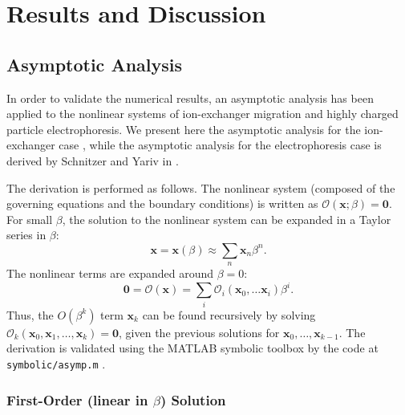 \documentclass[MSc,beforeExam]{iitcsthesis}
\newcommand\bx{\boldsymbol{x}}
\newcommand\bzero{\boldsymbol{0}}
\newcommand\cO{\mathcal{O}}
\begin{document}
\chapter{Results and Discussion} \label{ch:results}

\section{Asymptotic Analysis} \label{sec:asymp}
In order to validate the numerical results, an asymptotic analysis has been applied 
to the nonlinear systems of ion-exchanger migration 
and highly charged particle electrophoresis.
We present here the asymptotic analysis for the ion-exchanger case \cite{yariv2010migration},
while the asymptotic analysis for the electrophoresis case \cite{schnitzer2012surface}
is derived by Schnitzer and Yariv in \cite{schnitzer2012cubic}.

The derivation is performed as follows.
The nonlinear system (composed of the governing equations and the boundary conditions) 
is written as $\cO(\bx;\beta) = \bzero$.
For small $\beta$, the solution to the nonlinear system can be expanded in a Taylor series in $\beta$:
\begin{equation}
\bx = \bx(\beta) \approx \sum_n \bx_n \beta^n.
\end{equation}
The nonlinear terms
are expanded around $\beta = 0$:
\begin{equation}
\bzero = \cO(\bx) = \sum_i \cO_i(\bx_0, \ldots \bx_i) \beta^i.
\end{equation}
Thus, the $O(\beta^k)$ term $\bx_k$ can be found recursively by solving 
$\cO_k(\bx_0, \bx_1, \ldots, \bx_k) = \bzero$,
given the previous solutions for $\bx_0, \ldots, \bx_{k-1}$.
The derivation is validated using the MATLAB symbolic toolbox by the code 
at \verb|symbolic/asymp.m| \cite{source}.

\subsection{First-Order (linear in $\beta$) Solution} \label{app:linear}
\end{document}
